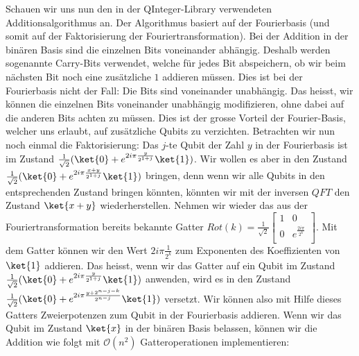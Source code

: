 Schauen wir uns nun den in der QInteger-Library verwendeten Additionsalgorithmus an. Der Algorithmus basiert auf der Fourierbasis (und somit auf der Faktorisierung der Fouriertransformation). Bei der Addition in der binären Basis sind die einzelnen Bits voneinander abhängig. Deshalb werden sogenannte Carry-Bits verwendet, welche für jedes Bit abspeichern, ob wir beim nächsten Bit noch eine zusätzliche $1$ addieren müssen. Dies ist bei der Fourierbasis nicht der Fall: Die Bits sind voneinander unabhängig. Das heisst, wir können die einzelnen Bits voneinander unabhängig modifizieren, ohne dabei auf die anderen Bits achten zu müssen. Dies ist der grosse Vorteil der Fourier-Basis, welcher uns erlaubt, auf zusätzliche Qubits zu verzichten. Betrachten wir nun noch einmal die Faktorisierung: Das $j$-te Qubit der Zahl $y$ in der Fourierbasis ist im Zustand $\frac{1}{\sqrt{2}}(\ket{0} + e^{2i\pi\frac{y}{2^{1 + j}}}\ket{1})$. Wir wollen es aber in den Zustand $\frac{1}{\sqrt{2}}(\ket{0} + e^{2i\pi\frac{x + y}{2^{1 + j}}}\ket{1})$ bringen, denn wenn wir alle Qubits in den entsprechenden Zustand bringen könnten, könnten wir mit der inversen $QFT$ den Zustand $\ket{x + y}$ wiederherstellen. Nehmen wir wieder das aus der Fouriertransformation bereits bekannte Gatter $Rot(k) = \frac{1}{\sqrt{2}}\begin{bmatrix}
    1 & 0 \\
    0 & e^{\frac{2i\pi}{2^k}} \\
\end{bmatrix}$. Mit dem Gatter können wir den Wert $2i\pi\frac{1}{2^k}$ zum Exponenten des Koeffizienten von $\ket{1}$ addieren. Das heisst, wenn wir das Gatter auf ein Qubit im Zustand $\frac{1}{\sqrt{2}}(\ket{0} + e^{2i\pi\frac{y}{2^{1 + j}}}\ket{1})$ anwenden, wird es in den Zustand $\frac{1}{\sqrt{2}}(\ket{0} + e^{2i\pi\frac{y + 2^{n - j - k}}{2^{n - j}}}\ket{1})$ versetzt. Wir können also mit Hilfe dieses Gatters Zweierpotenzen zum Qubit in der Fourierbasis addieren. Wenn wir das Qubit im Zustand $\ket{x}$ in der binären Basis belassen, können wir die Addition wie folgt mit $\mathcal O(n^2)$ Gatteroperationen implementieren:
